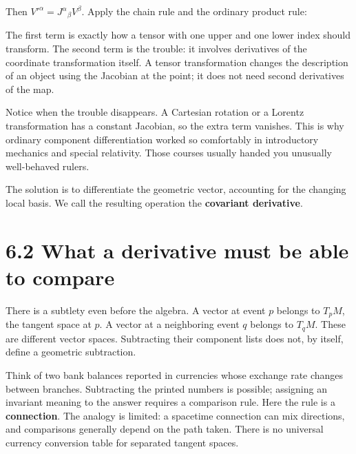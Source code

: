 \documentclass[
  11pt,
  letterpaper,
  oneside,
  openany]{scrbook}
\begin{document}
Then \(V'^\alpha=J^\alpha{}_{\beta}V^\beta\). Apply the chain rule and
the ordinary product rule:

\begin{center}
\begingroup
{}
\ifdim\wd\grmathbox>\linewidth
\resizebox{\linewidth}{!}{\usebox{\grmathbox}}
\else\usebox{\grmathbox}\fi
\endgroup
\end{center}

The first term is exactly how a tensor with one upper and one lower
index should transform. The second term is the trouble: it involves
derivatives of the coordinate transformation itself. A tensor
transformation changes the description of an object using the Jacobian
at the point; it does not need second derivatives of the map.

Notice when the trouble disappears. A Cartesian rotation or a Lorentz
transformation has a constant Jacobian, so the extra term vanishes. This
is why ordinary component differentiation worked so comfortably in
introductory mechanics and special relativity. Those courses usually
handed you unusually well-behaved rulers.

The solution is to differentiate the geometric vector, accounting for
the changing local basis. We call the resulting operation the
\textbf{covariant derivative}.

\hypertarget{what-a-derivative-must-be-able-to-compare}{%
\section{6.2 What a derivative must be able to
compare}\label{what-a-derivative-must-be-able-to-compare}}

There is a subtlety even before the algebra. A vector at event \(p\)
belongs to \(T_pM\), the tangent space at \(p\). A vector at a
neighboring event \(q\) belongs to \(T_qM\). These are different vector
spaces. Subtracting their component lists does not, by itself, define a
geometric subtraction.

Think of two bank balances reported in currencies whose exchange rate
changes between branches. Subtracting the printed numbers is possible;
assigning an invariant meaning to the answer requires a comparison rule.
Here the rule is a \textbf{connection}. The analogy is limited: a
spacetime connection can mix directions, and comparisons generally
depend on the path taken. There is no universal currency conversion
table for separated tangent spaces.
\end{document}
